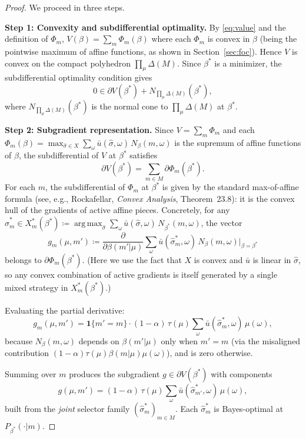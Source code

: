 \documentclass[12pt]{article}
\newcommand{\argmax}{\operatorname{arg\,max}}
\begin{document}
\begin{proof}
We proceed in three steps.

\medskip\noindent
\textbf{Step 1: Convexity and subdifferential optimality.}
By \eqref{eq:value} and the definition of $\Phi_m$, $V(\beta) = \sum_m \Phi_m(\beta)$ where each $\Phi_m$ is convex in $\beta$ (being the pointwise maximum of affine functions, as shown in Section~\ref{sec:foc}). Hence $V$ is convex on the compact polyhedron $\prod_\mu \Delta(M)$. Since $\beta^*$ is a minimizer, the subdifferential optimality condition gives
\begin{equation}
\label{eq:subdiff}
0 \in \partial V(\beta^*) + N_{\prod_\mu \Delta(M)}(\beta^*),
\end{equation}
where $N_{\prod_\mu \Delta(M)}(\beta^*)$ is the normal cone to $\prod_\mu \Delta(M)$ at $\beta^*$.

\medskip\noindent
\textbf{Step 2: Subgradient representation.}
Since $V = \sum_m \Phi_m$ and each $\Phi_m(\beta) = \max_{\hat\sigma \in X} \sum_\omega \bar{u}(\hat\sigma,\omega)\, N_\beta(m,\omega)$ is the supremum of affine functions of $\beta$, the subdifferential of $V$ at $\beta^*$ satisfies
\[
\partial V(\beta^*) = \sum_{m \in M} \partial \Phi_m(\beta^*).
\]
For each $m$, the subdifferential of $\Phi_m$ at $\beta^*$ is given by the standard max-of-affine formula (see, e.g., Rockafellar, \textit{Convex Analysis}, Theorem~23.8): it is the convex hull of the gradients of active affine pieces. Concretely, for any $\hat\sigma^*_m \in X^*_m(\beta^*) \coloneqq \argmax_{\hat\sigma} \sum_\omega \bar{u}(\hat\sigma,\omega)\, N_{\beta^*}(m,\omega)$, the vector
\[
g_m(\mu, m') \coloneqq \frac{\partial}{\partial \beta(m'|\mu)} \sum_\omega \bar{u}(\hat\sigma^*_m, \omega)\, N_\beta(m,\omega) \Big|_{\beta = \beta^*}
\]
belongs to $\partial \Phi_m(\beta^*)$. (Here we use the fact that $X$ is convex and $\bar{u}$ is linear in $\hat\sigma$, so any convex combination of active gradients is itself generated by a single mixed strategy in $X^*_m(\beta^*)$.)

Evaluating the partial derivative:
\[
g_m(\mu, m') = \mathbf{1}\{m' = m\} \cdot (1-\alpha)\,\tau(\mu) \sum_\omega \bar{u}(\hat\sigma^*_m, \omega)\,\mu(\omega),
\]
because $N_\beta(m,\omega)$ depends on $\beta(m'|\mu)$ only when $m' = m$ (via the misaligned contribution $(1-\alpha)\tau(\mu)\beta(m|\mu)\mu(\omega)$), and is zero otherwise.

Summing over $m$ produces the subgradient $g \in \partial V(\beta^*)$ with components
\begin{equation}
\label{eq:subgrad_component}
g(\mu, m') = (1-\alpha)\,\tau(\mu) \sum_\omega \bar{u}(\hat\sigma^*_{m'}, \omega)\,\mu(\omega),
\end{equation}
built from the \emph{joint} selector family $(\hat\sigma^*_m)_{m \in M}$. Each $\hat\sigma^*_m$ is Bayes-optimal at $P_{\beta^*}(\cdot|m)$.


\end{proof}
\end{document}
